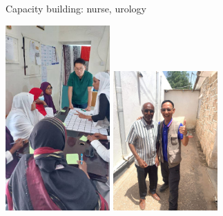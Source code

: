 \documentclass[aspectratio=169]{beamer}
\begin{document}
\begin{frame}{Capacity building: nurse, urology}
    \begin{center}
        \includegraphics[width=0.30\textwidth]{6963.jpg}
        \includegraphics[width=0.30\textwidth]{IMG_5040.jpeg}
    \end{center}
\end{frame}
\end{document}
